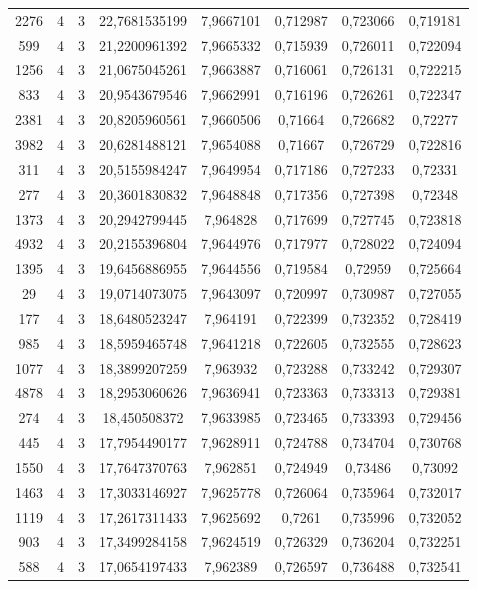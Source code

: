 \begin{longtable}{|c|c|c|c|c|c|c|c|}
2276 & 4 & 3 & 22,7681535199 & 7,9667101 & 0,712987 & 0,723066 & 0,719181 \\
599 & 4 & 3 & 21,2200961392 & 7,9665332 & 0,715939 & 0,726011 & 0,722094 \\
1256 & 4 & 3 & 21,0675045261 & 7,9663887 & 0,716061 & 0,726131 & 0,722215 \\
833 & 4 & 3 & 20,9543679546 & 7,9662991 & 0,716196 & 0,726261 & 0,722347 \\
2381 & 4 & 3 & 20,8205960561 & 7,9660506 & 0,71664 & 0,726682 & 0,72277 \\
3982 & 4 & 3 & 20,6281488121 & 7,9654088 & 0,71667 & 0,726729 & 0,722816 \\
311 & 4 & 3 & 20,5155984247 & 7,9649954 & 0,717186 & 0,727233 & 0,72331 \\
277 & 4 & 3 & 20,3601830832 & 7,9648848 & 0,717356 & 0,727398 & 0,72348 \\
1373 & 4 & 3 & 20,2942799445 & 7,964828 & 0,717699 & 0,727745 & 0,723818 \\
4932 & 4 & 3 & 20,2155396804 & 7,9644976 & 0,717977 & 0,728022 & 0,724094 \\
1395 & 4 & 3 & 19,6456886955 & 7,9644556 & 0,719584 & 0,72959 & 0,725664 \\
29 & 4 & 3 & 19,0714073075 & 7,9643097 & 0,720997 & 0,730987 & 0,727055 \\
177 & 4 & 3 & 18,6480523247 & 7,964191 & 0,722399 & 0,732352 & 0,728419 \\
985 & 4 & 3 & 18,5959465748 & 7,9641218 & 0,722605 & 0,732555 & 0,728623 \\
1077 & 4 & 3 & 18,3899207259 & 7,963932 & 0,723288 & 0,733242 & 0,729307 \\
4878 & 4 & 3 & 18,2953060626 & 7,9636941 & 0,723363 & 0,733313 & 0,729381 \\
274 & 4 & 3 & 18,450508372 & 7,9633985 & 0,723465 & 0,733393 & 0,729456 \\
445 & 4 & 3 & 17,7954490177 & 7,9628911 & 0,724788 & 0,734704 & 0,730768 \\
1550 & 4 & 3 & 17,7647370763 & 7,962851 & 0,724949 & 0,73486 & 0,73092 \\
1463 & 4 & 3 & 17,3033146927 & 7,9625778 & 0,726064 & 0,735964 & 0,732017 \\
1119 & 4 & 3 & 17,2617311433 & 7,9625692 & 0,7261 & 0,735996 & 0,732052 \\
903 & 4 & 3 & 17,3499284158 & 7,9624519 & 0,726329 & 0,736204 & 0,732251 \\
588 & 4 & 3 & 17,0654197433 & 7,962389 & 0,726597 & 0,736488 & 0,732541 \\

\end{longtable}
